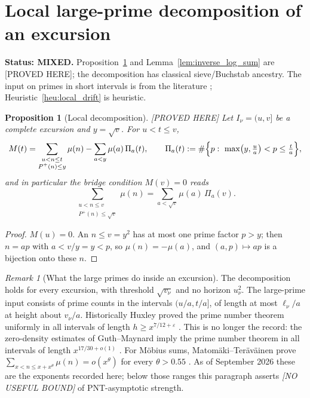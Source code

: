 \documentclass[11pt]{amsart}
\numberwithin{equation}{section}
\theoremstyle{plain}
\newtheorem{proposition}[theorem]{Proposition}
\theoremstyle{definition}
\theoremstyle{remark}
\newtheorem{remark}[theorem]{Remark}
\newcommand{\Pp}{P^{+}}
\begin{document}
\section{Local large-prime decomposition of an excursion}
\label{sec:local_large_prime}

\noindent\textbf{Status: MIXED.} Proposition~\ref{prop:local_large_prime}
and Lemma~\ref{lem:inverse_log_sum} are [PROVED HERE]; the decomposition has
classical sieve/Buchstab ancestry. The input on
primes in short intervals is from the literature \cite{Huxley1972};
Heuristic~\ref{heu:local_drift} is heuristic.

\begin{proposition}[Local decomposition]
\label{prop:local_large_prime}
\emph{[PROVED HERE]} Let $I_\nu=(u,v]$ be a complete excursion and
$y=\sqrt v$. For $u<t\le v$,
\begin{equation}
\label{eq:local_split}
  M(t)=\sum_{\substack{u<n\le t\\ \Pp(n)\le y}}\mu(n)
  -\sum_{a<y}\mu(a)\,\Pi_a(t),\qquad
  \Pi_a(t):=\#\Bigl\{p:\ \max\bigl(y,\tfrac ua\bigr)<p\le\tfrac ta\Bigr\},
\end{equation}
and in particular the bridge condition $M(v)=0$ reads
\begin{equation}
\label{eq:local_bridge}
  \sum_{\substack{u<n\le v\\ \Pp(n)\le\sqrt v}}\mu(n)
  =\sum_{a<\sqrt v}\mu(a)\,\Pi_a(v).
\end{equation}
\end{proposition}

\begin{proof}
$M(u)=0$. An $n\le v=y^2$ has at most one prime factor $p>y$; then
$n=ap$ with $a<v/y=y<p$, so $\mu(n)=-\mu(a)$, and $(a,p)\mapsto ap$ is a
bijection onto these $n$.
\end{proof}

\begin{remark}[What the large primes do inside an excursion]
\label{rem:local_meaning}
The decomposition holds for every excursion, with threshold $\sqrt{v_\nu}$
and no horizon $u_\nu^2$. The large-prime input consists of prime counts in
the intervals $(u/a,t/a]$, of length at most $\ell_\nu/a$ at height about
$v_\nu/a$. Historically Huxley proved the prime number theorem uniformly in all
intervals of length $h\ge x^{7/12+\varepsilon}$ \cite{Huxley1972}. This is
no longer the record: the zero-density estimates of Guth--Maynard imply the
prime number theorem in all intervals of length $x^{17/30+o(1)}$
\cite{GuthMaynard2024}. For M\"obius sums, Matom\"aki--Ter\"av\"ainen prove
$\sum_{x<n\le x+x^\theta}\mu(n)=o(x^\theta)$ for every
$\theta>0.55$ \cite{MatomakiTeravainen2023}. As of September 2026 these are the exponents recorded here; below those
ranges this paragraph asserts \emph{[NO USEFUL BOUND]} of PNT-asymptotic
strength.
\end{remark}
\end{document}
